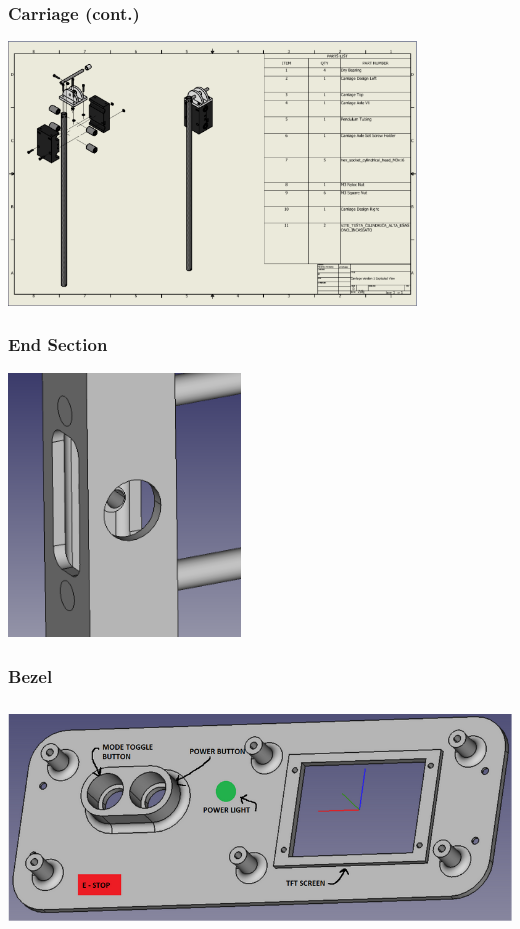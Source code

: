\documentclass[aspectratio=169]{beamer}
\begin{document}
\begin{frame}
    \frametitle{Carriage (cont.)}

    \includegraphics[height=7cm]{closeup2}
\end{frame}

\begin{frame}
    \frametitle{End Section}

    \includegraphics[height=7cm]{closeup3}
\end{frame}

\begin{frame}
    \frametitle{Bezel}

    \includegraphics[height=6cm]{closeup4}
\end{frame}
\end{document}
